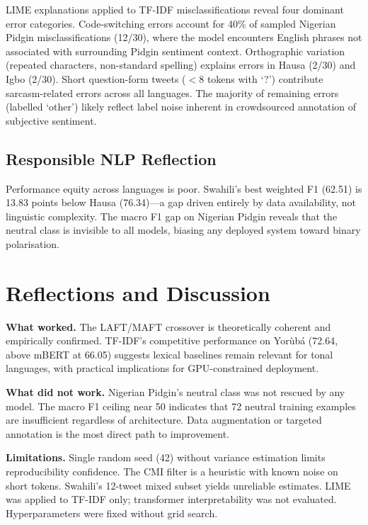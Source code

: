 \documentclass[11pt,twocolumn]{article}
\begin{document}
LIME explanations applied to TF-IDF misclassifications reveal four dominant error
categories. Code-switching errors account for 40\% of sampled Nigerian Pidgin
misclassifications (12/30), where the model encounters English phrases not associated with
surrounding Pidgin sentiment context. Orthographic variation (repeated characters,
non-standard spelling) explains errors in Hausa (2/30) and Igbo (2/30). Short
question-form tweets ($<$8 tokens with `?') contribute sarcasm-related errors across
all languages. The majority of remaining errors (labelled `other') likely reflect
label noise inherent in crowdsourced annotation of subjective sentiment.

\subsection{Responsible NLP Reflection}

Performance equity across languages is poor. Swahili's best weighted F1 (62.51) is
13.83 points below Hausa (76.34)---a gap driven entirely by data availability, not
linguistic complexity. The macro F1 gap on Nigerian Pidgin reveals that the neutral class
is invisible to all models, biasing any deployed system toward binary polarisation.

\section{Reflections and Discussion}

\textbf{What worked.} The LAFT/MAFT crossover is theoretically coherent and empirically
confirmed. TF-IDF's competitive performance on Yor\`{u}b\'{a} (72.64, above mBERT at 66.05)
suggests lexical baselines remain relevant for tonal languages, with practical implications
for GPU-constrained deployment.

\textbf{What did not work.} Nigerian Pidgin's neutral class was not rescued by any model.
The macro F1 ceiling near 50 indicates that 72 neutral training examples are insufficient
regardless of architecture. Data augmentation or targeted annotation is the most direct path
to improvement.

\textbf{Limitations.} Single random seed (42) without variance estimation limits
reproducibility confidence. The CMI filter is a heuristic with known noise on short tokens.
Swahili's 12-tweet mixed subset yields unreliable estimates. LIME was applied to TF-IDF
only; transformer interpretability was not evaluated. Hyperparameters were fixed without
grid search.
\end{document}
